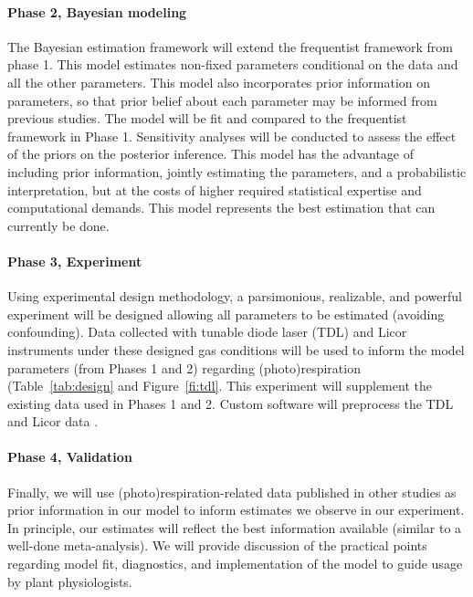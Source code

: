 \paragraph{Phase 2, Bayesian modeling}
The Bayesian estimation framework will extend the frequentist framework from phase 1.
This model estimates non-fixed parameters conditional on the data and all the other parameters.
This model also incorporates prior information on parameters,
  so that prior belief about each parameter may be informed from previous studies.
The model will be fit and compared to the frequentist framework in Phase 1.
Sensitivity analyses will be conducted to assess the effect of the priors on the posterior inference.
This model has the advantage of including prior information,
  jointly estimating the parameters,
  and a probabilistic interpretation,
  but at the costs of higher required statistical expertise and computational demands.
This model represents the best estimation that can currently be done.

\paragraph{Phase 3, Experiment}
Using experimental design methodology,
  a parsimonious, realizable, and powerful experiment will be designed
  allowing all parameters to be estimated (avoiding confounding).
Data collected with tunable diode laser (TDL) and Licor instruments
  under these designed gas conditions
  will be used to inform the model parameters (from Phases 1 and 2) regarding
  (photo)respiration (Table~\ref{tab:design} and Figure~\ref{fi:tdl}.
This experiment will supplement the existing data used in Phases 1 and 2.
Custom software will preprocess the TDL and Licor data
  \citep{ErhardtHanson:2011:tdllicor:estimatesdiscrimination}.

\paragraph{Phase 4, Validation}
Finally, we will use (photo)respiration-related data
  published in other studies as prior information in our model
  to inform estimates we observe in our experiment.
In principle, our estimates will reflect the best information available
  (similar to a well-done meta-analysis).
We will provide discussion of the practical points regarding model fit, diagnostics,
  and implementation of the model to guide usage by plant physiologists.

